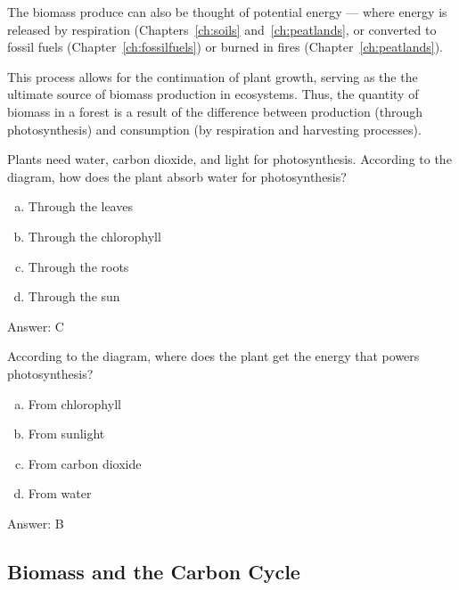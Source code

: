     
The biomass produce can also be thought of potential energy --- where energy is released by respiration (Chapters~\ref{ch:soils} and~\ref{ch:peatlands}, or converted to fossil fuels (Chapter~\ref{ch:fossilfuels}) or burned in fires (Chapter~\ref{ch:peatlands}). 

This process allows for the continuation of plant growth, serving as the the ultimate source of biomass production in ecosystems. Thus, the quantity of biomass in a forest is a result of the difference between production (through photosynthesis) and consumption (by respiration and harvesting processes).



\begin{problem}
  Plants need water, carbon dioxide, and light for photosynthesis. According to the diagram, how does the plant absorb water for photosynthesis? 
\begin{enumerate}[(a)]
    \item Through the leaves
    \item Through the chlorophyll
    \item Through the roots
    \item Through the sun
\end{enumerate}  


\end{problem}

Answer: C

\begin{problem}
According to the diagram, where does the plant get the energy that powers photosynthesis?
\begin{enumerate}[(a)]
\item From chlorophyll
\item From sunlight
\item From carbon dioxide
\item From water
\end{enumerate}  

Answer: B
\end{problem}

\subsection{Biomass and the Carbon Cycle}




